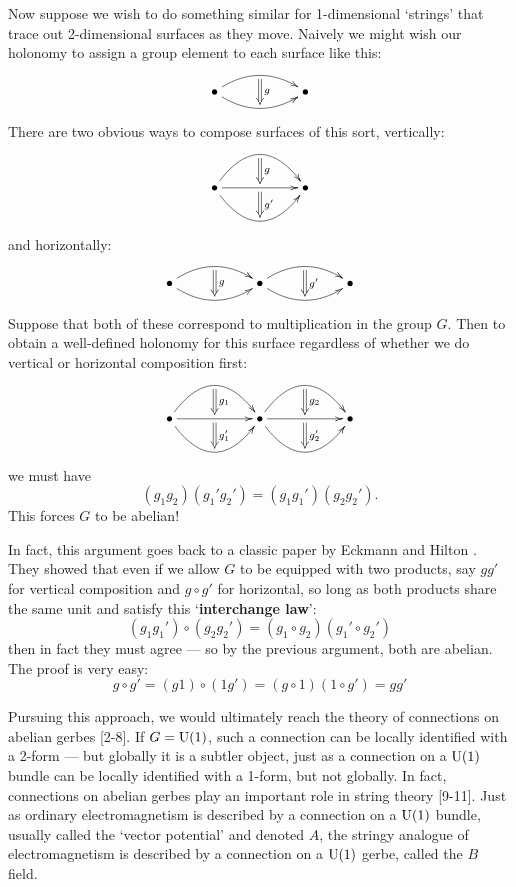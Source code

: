 \documentclass{article}
\newcommand{\U}{{\rm U}}
\begin{document}
Now suppose we wish to do something similar
for 1-dimensional `strings' that trace out 2-dimensional surfaces
as they move.  Naively we might wish our holonomy to assign a group 
element to each surface like this:
\[
\xymatrix{
   \bullet \ar@/^1pc/[rr]_{}="0"
           \ar@/_1pc/[rr]_{}="1"
           \ar@{=>}"0";"1"^{g}
&& \bullet
}
\]
There are two obvious ways to compose surfaces of this sort, vertically:
\[
\xymatrix{
   \bullet \ar@/^2pc/[rr]_{}="0"
           \ar[rr]_{}="1"
           \ar@{=>}"0";"1"^{g}
           \ar@/_2pc/[rr]_{}="2"
           \ar@{=>}"1";"2"^{g'}
&& \bullet
}
\]
and horizontally:
\[
\xymatrix{
   \bullet \ar@/^1pc/[rr]_{}="0"
           \ar@/_1pc/[rr]_{}="1"
           \ar@{=>}"0";"1"^{g}
&& \bullet \ar@/^1pc/[rr]_{}="2"
           \ar@/_1pc/[rr]_{}="3"
           \ar@{=>}"2";"3"^{g'}
&& \bullet
}
\]
Suppose that both of these correspond to multiplication
in the group $G$.  Then to obtain a well-defined holonomy for this
surface regardless of whether we do vertical or horizontal composition
first:
\[
\xymatrix{
   \bullet \ar@/^2pc/[rr]_{}="0"
           \ar[rr]_{}="1"
           \ar@{=>}"0";"1"^{g_1}
           \ar@/_2pc/[rr]_{}="2"
           \ar@{=>}"1";"2"^{g_1^\prime}
&& \bullet \ar@/^2pc/[rr]_{}="3"
           \ar[rr]_{}="4"
           \ar@{=>}"3";"4"^{g_2}
           \ar@/_2pc/[rr]_{}="5"
           \ar@{=>}"4";"5"^{g'_2}
&& \bullet
}
\]
we must have
\[      (g_1 g_2)(g_1' g_2') = (g_1 g_1')(g_2 g_2') . \]
This forces $G$ to be abelian!

In fact, this argument goes back to a classic paper by
Eckmann and Hilton \cite{EckmannHilton}.  They showed
that even if we allow $G$ to be equipped with two products,
say $gg'$ for vertical composition and $g \circ g'$ for
horizontal, so long as both products share the
same unit and satisfy this `{\bf interchange law}':
\[  
  (g_1 g_1') \circ (g_2 g_2') =
      (g_1 \circ g_2) (g_1' \circ g_2')  
\]
then in fact they must agree --- so by the previous argument,
both are abelian.  The proof is very easy:
\[  
     g \circ g' 
   = (g 1) \circ (1 g') 
   = (g \circ 1) (1 \circ g') 
   = g g' 
\]

Pursuing this approach, we would ultimately reach the theory of
connections on abelian gerbes [2-8].
If $G = \U(1)$, such a connection can be locally identified with a 
2-form --- but globally it is a subtler object, just as a connection
on a $\U(1)$ bundle can be locally identified with a 1-form, but not
globally.  In fact, connections on abelian gerbes play an important role 
in string theory [9-11].
Just as ordinary electromagnetism is described by a connection on a $\U(1)$ 
bundle, usually called the `vector potential' and denoted $A$, the 
stringy analogue of electromagnetism is described by a connection on 
a $\U(1)$ gerbe, called the $B$ field.
\end{document}
